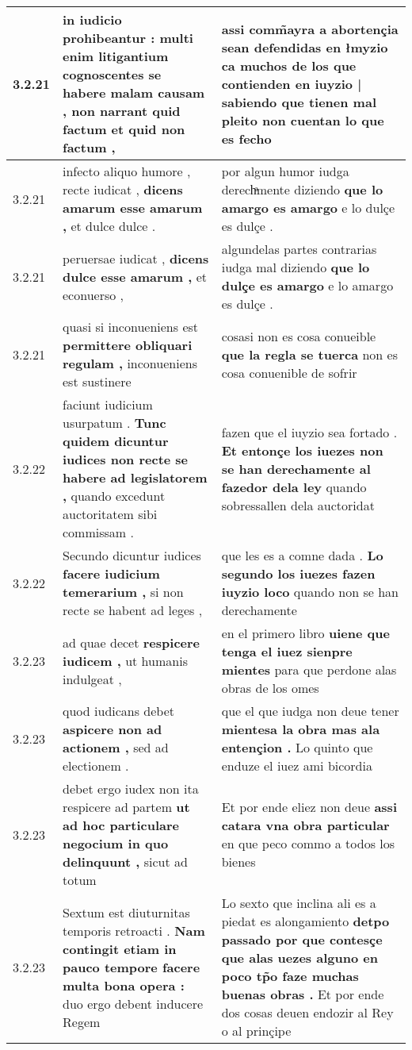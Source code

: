 \begin{tabular}{|p{1cm}|p{6.5cm}|p{6.5cm}|}
3.2.21 & in iudicio prohibeantur : \textbf{ multi enim litigantium cognoscentes se habere malam causam , } non narrant quid factum et quid non factum , & assi comm̃ayra a abortençia sean defendidas en łmyzio \textbf{ ca muchos de los que contienden en iuyzio | sabiendo que tienen mal pleito } non cuentan lo que es fecho \\\hline
3.2.21 & infecto aliquo humore , recte iudicat , \textbf{ dicens amarum esse amarum , } et dulce dulce . & por algun humor iudga derechͣmente diziendo \textbf{ que lo amargo es amargo } e lo dulçe es dulçe . \\\hline
3.2.21 & peruersae iudicat , \textbf{ dicens dulce esse amarum , } et econuerso , & algundelas partes contrarias iudga mal diziendo \textbf{ que lo dulçe es amargo } e lo amargo es dulçe . \\\hline
3.2.21 & quasi si inconueniens est \textbf{ permittere obliquari regulam , } inconueniens est sustinere & cosasi non es cosa conueible \textbf{ que la regla se tuerca } non es cosa conuenible de sofrir \\\hline
3.2.22 & faciunt iudicium usurpatum . \textbf{ Tunc quidem dicuntur iudices non recte se habere ad legislatorem , } quando excedunt auctoritatem sibi commissam . & fazen que el iuyzio sea fortado . \textbf{ Et entonçe los iuezes non se han derechamente al fazedor dela ley } quando sobressallen dela auctoridat \\\hline
3.2.22 & Secundo dicuntur iudices \textbf{ facere iudicium temerarium , } si non recte se habent ad leges , & que les es a comne dada . \textbf{ Lo segundo los iuezes fazen iuyzio loco } quando non se han derechamente \\\hline
3.2.23 & ad quae decet \textbf{ respicere iudicem , } ut humanis indulgeat , & en el primero libro \textbf{ uiene que tenga el iuez sienpre mientes } para que perdone alas obras de los omes \\\hline
3.2.23 & quod iudicans debet \textbf{ aspicere non ad actionem , } sed ad electionem . & que el que iudga non deue tener \textbf{ mientesa la obra mas ala entençion . } Lo quinto que enduze el iuez ami bicordia \\\hline
3.2.23 & debet ergo iudex non ita respicere ad partem \textbf{ ut ad hoc particulare negocium in quo delinquunt , } sicut ad totum & Et por ende eliez non deue \textbf{ assi catara vna obra particular } en que peco commo a todos los bienes \\\hline
3.2.23 & Sextum est diuturnitas temporis retroacti . \textbf{ Nam contingit etiam in pauco tempore facere multa bona opera : } duo ergo debent inducere Regem & Lo sexto que inclina ali es a piedat es alongamiento \textbf{ detpo passado por que contesçe que alas uezes alguno en poco tp̃o faze muchas buenas obras . } Et por ende dos cosas deuen endozir al Rey o al prinçipe \\\hline

\end{tabular}
